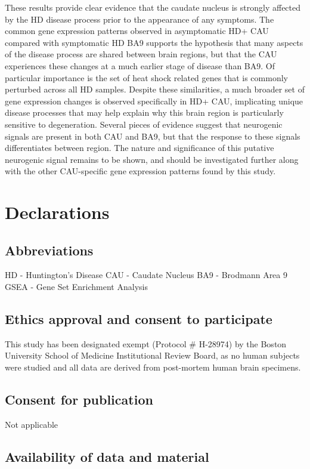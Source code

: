 \documentclass[fleqn,10pt,table]{wlscirep}
\begin{document}
These results provide clear evidence that the caudate nucleus is strongly affected by the HD disease process prior to the appearance of any symptoms.
The common gene expression patterns observed in asymptomatic HD+ CAU compared with symptomatic HD BA9 supports the hypothesis that many aspects of the disease process are shared between brain regions, but that the CAU experiences these changes at a much earlier stage of disease than BA9.
Of particular importance is the set of heat shock related genes that is commonly perturbed across all HD samples.
Despite these similarities, a much broader set of gene expression changes is observed specifically in HD+ CAU, implicating unique disease processes that may help explain why this brain region is particularly sensitive to degeneration.
Several pieces of evidence suggest that neurogenic signals are present in both CAU and BA9, but that the response to these signals differentiates between region.
The nature and significance of this putative neurogenic signal remains to be shown, and should be investigated further along with the other CAU-specific gene expression patterns found by this study.

\section{Declarations}

\subsection{Abbreviations}
HD - Huntington's Disease
CAU - Caudate Nucleus
BA9 - Brodmann Area 9
GSEA - Gene Set Enrichment Analysis

\subsection{Ethics approval and consent to participate}

This study has been designated exempt (Protocol \# H-28974) by the Boston University School of Medicine Institutional Review Board, as no human subjects were studied and all data are derived from post-mortem human brain specimens.

\subsection{Consent for publication}

Not applicable

\subsection{Availability of data and material}
\end{document}
